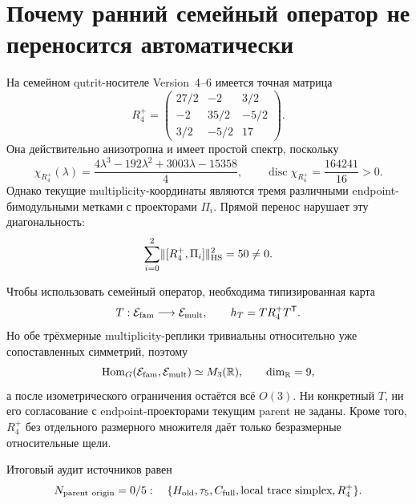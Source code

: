 \section{Почему ранний семейный оператор не переносится автоматически}

На семейном qutrit-носителе Version~4--6 имеется точная матрица
\begin{equation}
 R_4^+=\begin{pmatrix}
 27/2&-2&3/2\\
 -2&35/2&-5/2\\
 3/2&-5/2&17
 \end{pmatrix}.
 \label{eq:v8-baryon-c0-parent-origin-family-r4-plus}
\end{equation}
Она действительно анизотропна и имеет простой спектр, поскольку
\begin{equation}
 \chi_{R_4^+}(\lambda)
 =\frac{4\lambda^3-192\lambda^2+3003\lambda-15358}{4},
 \qquad
 \operatorname{disc}\chi_{R_4^+}=\frac{164241}{16}>0.
 \label{eq:v8-baryon-c0-parent-origin-r4-simple-spectrum}
\end{equation}
Однако текущие multiplicity-координаты являются тремя различными
endpoint-бимодульными метками с проекторами $\Pi_i$. Прямой перенос
нарушает эту диагональность:
\begin{equation}
 \sum_{i=0}^{2}\lVert[R_4^+,\Pi_i]\rVert_{\rm HS}^2=50\ne0.
 \label{eq:v8-baryon-c0-parent-origin-r4-endpoint-commutator}
\end{equation}

Чтобы использовать семейный оператор, необходима типизированная карта
\begin{equation}
 T:\mathcal E_{\rm fam}\longrightarrow\mathcal E_{\rm mult},
 \qquad h_T=T R_4^+T^{\mathsf T}.
 \label{eq:v8-baryon-c0-parent-origin-family-multiplicity-map}
\end{equation}
Но обе трёхмерные multiplicity-реплики тривиальны относительно уже
сопоставленных симметрий, поэтому
\begin{equation}
 \operatorname{Hom}_G(\mathcal E_{\rm fam},\mathcal E_{\rm mult})
 \simeq M_3(\mathbb R),
 \qquad \dim_{\mathbb R}=9,
 \label{eq:v8-baryon-c0-parent-origin-intertwiner-space}
\end{equation}
а после изометрического ограничения остаётся всё $O(3)$. Ни конкретный
$T$, ни его согласование с endpoint-проекторами текущим parent не заданы.
Кроме того, $R_4^+$ без отдельного размерного множителя даёт только
безразмерные относительные щели.

Итоговый аудит источников равен
\begin{equation}
 N_{\rm parent\ origin}=0/5:
 \quad\{H_{\rm old},\tau_5,C_{\rm full},
 \text{local trace simplex},R_4^+\}.
 \label{eq:v8-baryon-c0-parent-origin-candidate-ledger}
\end{equation}

